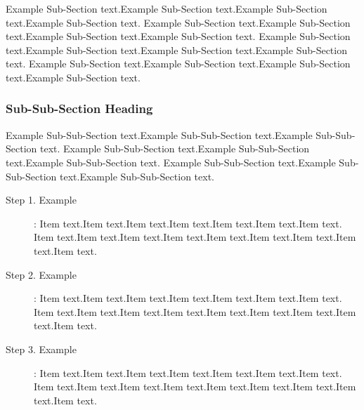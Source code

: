 \documentclass[11pt,twosided,a4paper]{report}
\begin{document}
Example Sub-Section text.Example Sub-Section text.Example Sub-Section text.Example Sub-Section text.
Example Sub-Section text.Example Sub-Section text.Example Sub-Section text.Example Sub-Section text.
Example Sub-Section text.Example Sub-Section text.Example Sub-Section text.Example Sub-Section text.
Example Sub-Section text.Example Sub-Section text.Example Sub-Section text.Example Sub-Section text.

\subsubsection{Sub-Sub-Section Heading}
Example Sub-Sub-Section text.Example Sub-Sub-Section text.Example Sub-Sub-Section text.
Example Sub-Sub-Section text.Example Sub-Sub-Section text.Example Sub-Sub-Section text.
Example Sub-Sub-Section text.Example Sub-Sub-Section text.Example Sub-Sub-Section text.

\begin{description}
\item[Step 1. Example]: Item text.Item text.Item text.Item text.Item text.Item text.Item text.
Item text.Item text.Item text.Item text.Item text.Item text.Item text.Item text.Item text.

\item[Step 2. Example]: Item text.Item text.Item text.Item text.Item text.Item text.Item text.
Item text.Item text.Item text.Item text.Item text.Item text.Item text.Item text.Item text.

\item[Step 3. Example]: Item text.Item text.Item text.Item text.Item text.Item text.Item text.
Item text.Item text.Item text.Item text.Item text.Item text.Item text.Item text.Item text.
\end{description}


\lstset{frame=shadowbox,language=Java, caption=Sample Java Code, label=JavaSample}


\ifx\collected\undefined
\newcommand{\collected}{\true}

\end{document}
